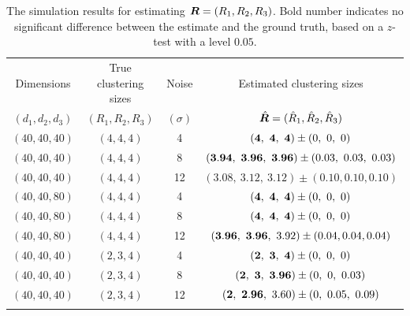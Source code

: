 \documentclass{article}
\begin{document}
\begin{appendices}
\begin{table}[http]
	\begin{tabular}{c|c|c|c}
		\hline
		Dimensions &True clustering sizes&Noise&Estimated clustering sizes\\ 
$(d_1,d_2,d_3)$&$(R_1,R_2,R_3)$&$(\sigma)$&$\hat {\bm{R}}=(\hat R_1,\hat R_2,\hat R_3)$\\
		\hline
		$(40,40,40)$&$(4,4,4)$&4&$({\bf 4},\ {\bf 4},\ {\bf 4})\pm (0,\ 0,\ 0)$\\
		$(40,40,40)$&$(4,4,4)$&8&$({\bf 3.94},\ {\bf 3.96},\ {\bf 3.96})\pm (0.03,\ 0.03,\ 0.03)$\\
		$(40,40,40)$&$(4,4,4)$&12&$(3.08,\ 3.12,\ 3.12)\pm (0.10,0.10,0.10)$\\
		\hline
		$(40,40,80)$&$(4,4,4)$&4&$({\bf 4},\ {\bf 4},\ {\bf 4})\pm (0,\ 0,\ 0)$\\
		$(40,40,80)$&$(4,4,4)$&8&$({\bf 4},\ {\bf 4},\ {\bf 4})\pm (0,\ 0,\ 0)$\\
		$(40,40,80)$&$(4,4,4)$&12&$({\bf 3.96},\ {\bf 3.96},\ 3.92)\pm (0.04,0.04,0.04)$\\
			\hline
		$(40,40,40)$&$(2,3,4)$&4&$({\bf 2},\ {\bf 3},\ {\bf 4})\pm (0,\ 0,\ 0)$\\
		$(40,40,40)$&$(2,3,4)$&8&$({\bf 2},{\bf \ 3},\ {\bf 3.96})\pm (0,\ 0,\ 0.03)$ \\
		$(40,40,40)$&$(2,3,4)$&12&$({\bf 2},\ {\bf 2.96},\ 3.60)\pm (0,\ 0.05,\ 0.09)$\\
\vspace{.1cm}
	\end{tabular}
		\caption{The simulation results for estimating $\bm{R}=(R_1,R_2,R_3)$. Bold number indicates no significant difference between the estimate and the ground truth, based on a $z$-test with a level $0.05$.}\label{tab:rank}
\end{table}


\end{appendices}
\end{document}
